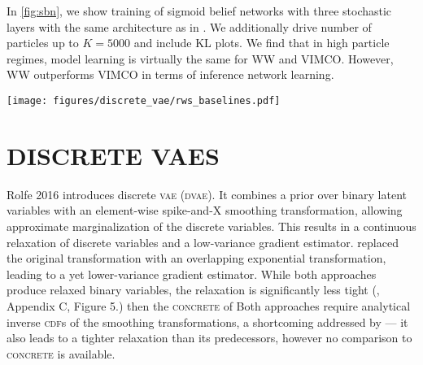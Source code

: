 In \cref{fig:sbn}, we show training of sigmoid belief networks with three stochastic layers with the same architecture as in \citet{mnih2016variational}.
We additionally drive number of particles up to $K = 5000$ and include \gls{KL} plots.
We find that in high particle regimes, model learning is virtually the same for \gls{WW} and \gls{VIMCO}.
However, \gls{WW} outperforms \gls{VIMCO} in terms of inference network learning.

\begin{figure*}[!ht]
  \texttt{[image: figures/discrete\_vae/rws\_baselines.pdf]}
  \vspace*{-4ex}
  \caption{
    Training of sigmoid belief nets.
    \emph{(Left)}
    Training curves:
    \gls{WW} learns faster than \gls{VIMCO} but results in equal or slightly worse end test log likelihood.
    \emph{(Middle)}
    Log evidence values at the end of training:
    \gls{VIMCO} is slightly better than \gls{WW} in low-particle regimes but virtually the same in high-particle regimes.
    \emph{(Right)}
    \gls{KL} divergence at the end of training:
    \gls{WW} results in much lower \gls{KL} divergence than \gls{VIMCO}.
  }
  \label{fig:sbn}
  \vspace*{-2ex}
\end{figure*}

\section{DISCRETE VAES}
\label{app:dvae}

Rolfe 2016 \citep{rolfe2016dvae} introduces discrete \textsc{vae} (\textsc{dvae}).
It combines a prior over binary latent variables with an element-wise spike-and-X smoothing transformation, allowing approximate marginalization of the discrete variables.
This results in a continuous relaxation of discrete variables and a low-variance gradient estimator.
\citet{vahdat2018dvaepp} replaced the original transformation with an overlapping exponential transformation, leading to a yet lower-variance gradient estimator.
While both approaches produce relaxed binary variables, the relaxation is  significantly less tight (\cite{vahdat2018dvaepp}, Appendix C, Figure 5.) then the \textsc{concrete} of \cite{jang2017categorical,maddison2017concrete}
Both approaches require analytical inverse \textsc{cdf}s of the smoothing transformations, a shortcoming addressed by \citet{vahdat2018dvaehash} --- it also leads to a tighter relaxation than its predecessors, however no comparison to \textsc{concrete} is available.

